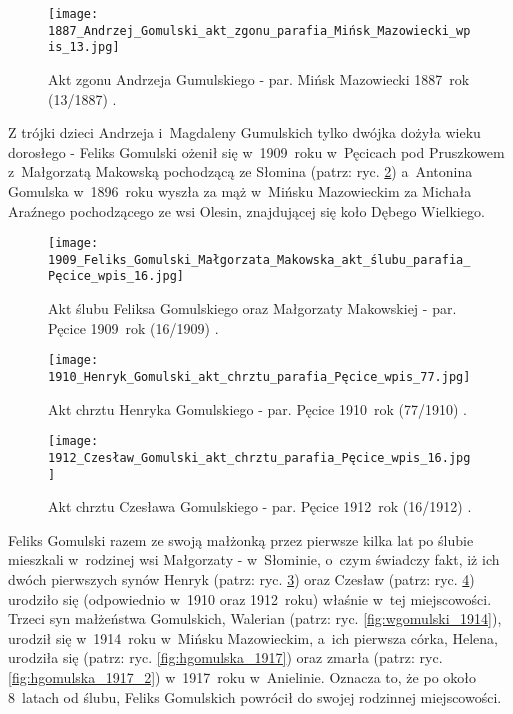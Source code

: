 \begin{figure}[!ht]
    \vspace*{0.5cm}
    \centering \texttt{[image: 
        1887\_Andrzej\_Gomulski\_akt\_zgonu\_parafia\_Mińsk\_Mazowiecki\_wpis\_13.jpg]}
    \captionsetup{format=hang}
    \caption{Akt zgonu Andrzeja Gumulskiego - par. Mińsk Mazowiecki 
    1887~rok (13/1887) \cite{par_minsk2}.}
    \label{fig:agomulski_1887}
\end{figure}

Z trójki dzieci Andrzeja i~Magdaleny Gumulskich tylko dwójka dożyła wieku 
dorosłego - Feliks Gomulski ożenił się w~1909~roku w~Pęcicach pod Pruszkowem 
z~Małgorzatą Makowską pochodzącą ze Słomina (patrz: ryc. 
\ref{fig:fgomulski_1909}) a~Antonina Gomulska w~1896~roku wyszła za mąż 
w~Mińsku Mazowieckim za Michała Araźnego pochodzącego ze wsi Olesin, 
znajdującej się koło Dębego Wielkiego.

\begin{figure}[!ht]
    \vspace*{0.5cm}
    \centering \texttt{[image: 
        1909\_Feliks\_Gomulski\_Małgorzata\_Makowska\_akt\_ślubu\_parafia\_Pęcice\_wpis\_16.jpg]}
    \captionsetup{format=hang}
    \caption{Akt ślubu Feliksa Gomulskiego oraz Małgorzaty Makowskiej - par. 
    Pęcice 1909~rok (16/1909) \cite{par_pecice}.}
    \label{fig:fgomulski_1909}
\end{figure}

\begin{figure}[!ht]
    \vspace*{0.5cm}
    \centering \texttt{[image: 
        1910\_Henryk\_Gomulski\_akt\_chrztu\_parafia\_Pęcice\_wpis\_77.jpg]}
    \captionsetup{format=hang}
    \caption{Akt chrztu Henryka Gomulskiego - par. Pęcice 1910~rok (77/1910) 
    \cite{par_pecice}.}
    \label{fig:hgomulski_1910}
\end{figure}

\begin{figure}[!ht]
    \vspace*{0.5cm}
    \centering \texttt{[image: 
        1912\_Czesław\_Gomulski\_akt\_chrztu\_parafia\_Pęcice\_wpis\_16.jpg]}
    \captionsetup{format=hang}
    \caption{Akt chrztu Czesława Gomulskiego - par. Pęcice 1912~rok (16/1912) 
    \cite{par_pecice}.}
    \label{fig:czgomulski_1912}
\end{figure}

Feliks Gomulski razem ze swoją małżonką przez pierwsze kilka lat po ślubie 
mieszkali w~rodzinej wsi Małgorzaty - w~Słominie, o~czym świadczy fakt, iż 
ich dwóch pierwszych synów Henryk (patrz: ryc. \ref{fig:hgomulski_1910}) oraz 
Czesław (patrz: ryc. \ref{fig:czgomulski_1912}) urodziło się (odpowiednio 
w~1910 oraz 1912~roku) właśnie w~tej miejscowości. Trzeci syn małżeństwa 
Gomulskich, Walerian (patrz: ryc. \ref{fig:wgomulski_1914}), urodził się 
w~1914~roku w~Mińsku Mazowieckim, a~ich pierwsza córka, Helena, urodziła 
się (patrz: ryc. \ref{fig:hgomulska_1917}) oraz zmarła (patrz: ryc. 
\ref{fig:hgomulska_1917_2}) w~1917~roku w~Anielinie. Oznacza to, że po około 
8~latach od ślubu, Feliks Gomulskich powrócił do swojej rodzinnej 
miejscowości.

